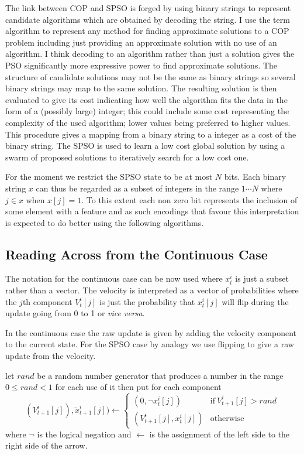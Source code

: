 \documentclass[a4paper,oneside,english]{article}
\numberwithin{equation}{section}
\numberwithin{figure}{section}
\begin{document}
The link between COP and SPSO is forged by using binary strings to represent candidate algorithms which are obtained by decoding the string. I use the term algorithm to represent any method for finding approximate solutions to a COP problem including just providing an approximate solution with no use of an algorithm. I think decoding to an algorithm rather than just a solution gives the PSO significantly more expressive power to find approximate solutions. The structure of candidate solutions may not be the same as binary strings  so several binary strings may map to the same solution. The resulting solution is then evaluated to give its cost indicating how well the algorithm fits the data in the form of a (possibly large) integer; this could include some cost representing the complexity of the used algorithm; lower values being preferred to higher values. This procedure gives a mapping from a binary string to a integer as a cost of the binary string. The SPSO is used to learn a low cost global solution by using a swarm of proposed solutions to iteratively search for a low cost one.  

For the moment we restrict the SPSO state to be at most $N$ bits. Each binary string $x$ can thus be regarded as a subset of integers in the range $1 \cdots N$  where $j \in x$ when $x[j] = 1$. To this extent each non zero bit represents the inclusion of some element with a feature and as such encodings that favour this interpretation is expected to do better using the following algorithms. 

\subsection{Reading Across from the Continuous Case}
The notation for the continuous case can be now used where $x_t^i$ is just a subset rather than a vector. The velocity is interpreted as a vector of probabilities  where the $j$th component $V_t^i[j]$ is just the probability that $x_t^i[j]$ will flip during the update going from 0 to 1 or \textit{vice versa}. 

In the continuous case the raw update is given by adding the velocity component to the current state. For the SPSO case by analogy we use flipping to give a raw update from the velocity.

let $rand$ be a random number generator that produces a number in the range $0\leq rand < 1$ for each use of it then put for each component
\begin{equation}\label{raw_update}
(V_{t+1}^i[j]),\breve{x}_{t+1}^i[j]) \leftarrow\left\lbrace 
\begin{array}{cc}
(0,\neg x_t^i[j])&\mathrm{if}\:V_{t+1}^i[j]>rand \\
(V_{t+1}^i[j],x_t^i[j])&\mathrm{otherwise}
\end{array}\right.
\end{equation}
where $\neg$ is the logical negation and $\leftarrow$ is the assignment of the left side to the right side of the arrow. 
\end{document}
